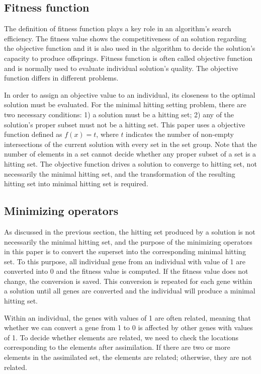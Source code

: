 \subsection{Fitness function}
The definition of fitness function plays a key role in an algorithm's search efficiency.
The fitness value shows the competitiveness of an solution regarding the objective function and it is also used in the algorithm to decide the solution's capacity to produce offsprings.
Fitness function is often called objective function and is normally used to evaluate individual solution's quality.
The objective function differs in different problems.

In order to assign an objective value to an individual, its closeness to the optimal solution must be evaluated.
For the minimal hitting setting problem, there are two necessary conditions: 1) a solution must be a hitting set; 2) any of the solution's proper subset must not be a hitting set.
This paper uses a objective function defined as $f(x) = t$, where $t$ indicates the number of non-empty intersections of the current solution with every set in the set group.
Note that the number of elements in a set cannot decide whether any proper subset of a set is a hitting set.
The objective function drives a solution to converge to hitting set, not necessarily the minimal hitting set, and the transformation of the resulting hitting set into minimal hitting set is required.



\subsection{Minimizing operators}
As discussed in the previous section, the hitting set produced by a solution is not necessarily the minimal hitting set, and the purpose of the minimizing operators in this paper is to convert the superset into the corresponding minimal hitting set.
To this purpose, all individual gene from an individual with value of 1 are converted into 0 and the fitness value is computed.
If the fitness value does not change, the conversion is saved.
This conversion is repeated for each gene within a solution until all genes are converted and the individual will produce a minimal hitting set.

Within an individual, the genes with values of 1 are often related, meaning that whether we can convert a gene from 1 to 0 is affected by other genes with values of 1.
To decide whether elements are related, we need to check the locations corresponding to the elements after assimilation.
If there are two or more elements in the assimilated set, the elements are related; otherwise, they are not related.

